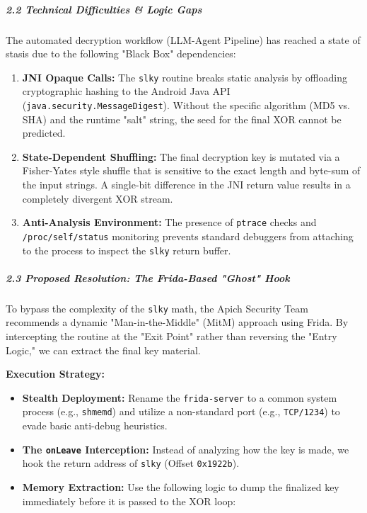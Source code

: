 \documentclass[
]{article}
\begin{document}
\subparagraph{2.2 Technical Difficulties \& Logic
Gaps}\label{22-technical-difficulties--logic-gaps}

The automated decryption workflow (LLM-Agent Pipeline) has reached a
state of stasis due to the following "Black Box" dependencies:

\begin{enumerate}
\def\labelenumi{\arabic{enumi}.}
\item
  \textbf{JNI Opaque Calls:} The \texttt{slky} routine breaks static
  analysis by offloading cryptographic hashing to the Android Java API
  (\texttt{java.security.MessageDigest}). Without the specific algorithm
  (MD5 vs. SHA) and the runtime "salt" string, the seed for the final
  XOR cannot be predicted.
\item
  \textbf{State-Dependent Shuffling:} The final decryption key is
  mutated via a Fisher-Yates style shuffle that is sensitive to the
  exact length and byte-sum of the input strings. A single-bit
  difference in the JNI return value results in a completely divergent
  XOR stream.
\item
  \textbf{Anti-Analysis Environment:} The presence of \texttt{ptrace}
  checks and \texttt{/proc/self/status} monitoring prevents standard
  debuggers from attaching to the process to inspect the \texttt{slky}
  return buffer.
\end{enumerate}

\subparagraph{2.3 Proposed Resolution: The Frida-Based "Ghost"
Hook}\label{23-proposed-resolution-the-frida-based-ghost-hook}

To bypass the complexity of the \texttt{slky} math, the Apich Security
Team recommends a dynamic "Man-in-the-Middle" (MitM) approach using
Frida. By intercepting the routine at the "Exit Point" rather than
reversing the "Entry Logic," we can extract the final key material.

\textbf{Execution Strategy:}

\begin{itemize}
\item
  \textbf{Stealth Deployment:} Rename the \texttt{frida-server} to a
  common system process (e.g., \texttt{shmemd}) and utilize a
  non-standard port (e.g., \texttt{TCP/1234}) to evade basic anti-debug
  heuristics.
\item
  \textbf{The \texttt{onLeave} Interception:} Instead of analyzing how
  the key is made, we hook the return address of \texttt{slky} (Offset
  \texttt{0x1922b}).
\item
  \textbf{Memory Extraction:} Use the following logic to dump the
  finalized key immediately before it is passed to the XOR loop:
\end{itemize}
\end{document}
